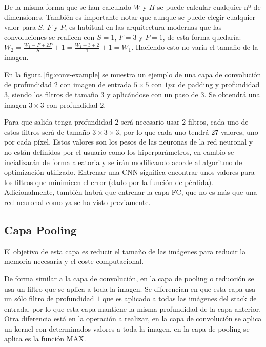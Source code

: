 De la misma forma que se han calculado $W$ y $H$ se puede calcular cualquier nº de dimensiones. También es importante notar que aunque se puede elegir cualquier valor para $S$, $F$ y $P$, es habitual en las arquitectura modernas que las convoluciones se realicen con $S=1$, $F=3$ y $P=1$, de esta forma quedaría: $W_2 = \frac{W_1-F+2P}{S} + 1 = \frac{W_1 - 3 + 2}{1} + 1 = W_1$. Haciendo esto no varía el tamaño de la imagen.

En la figura \ref{fig:conv-example}\cite{Li2020} se muestra un ejemplo de una capa de convolución de profundidad $2$ con imagen de entrada $5 \times 5$ con $1 px$ de padding y profundidad $3$, siendo los filtros de tamaño $3$ y aplicándose con un paso de $3$. Se obtendrá una imagen $3\times 3$ con profundidad $2$.

Para que salida tenga profundidad $2$ será necesario usar $2$ filtros, cada uno de estos filtros será de tamaño $3\times 3 \times 3$, por lo que cada uno tendrá 27 valores, uno por cada píxel. Estos valores son los pesos de las neuronas de la red neuronal y no están definidos por el usuario como los hiperparámetros, en cambio se incializarán de forma aleatoria y se irán modificando acorde al algoritmo de optimización utilizado. Entrenar una CNN significa encontrar unos valores para los filtros que minimicen el error (dado por la función de pérdida). Adicionalmente, también habrá que entrenar la capa FC, que no es más que una red neuronal como ya se ha visto previamente.


\newpage\subsection{Capa Pooling}

El objetivo de esta capa es reducir el tamaño de las imágenes para reducir la memoria necesaria y el coste computacional.

De forma similar a la capa de convolución, en la capa de pooling o reducción se usa un filtro que se aplica a toda la imagen. Se diferencian en que esta capa usa un sólo filtro de profundidad $1$ que es aplicado a todas las imágenes del stack de entrada, por lo que esta capa mantiene la misma profundidad de la capa anterior. Otra diferencia está en la operación a realizar, en la capa de convolución se aplica un kernel con determinados valores a toda la imagen, en la capa de pooling se aplica es la función MAX.

